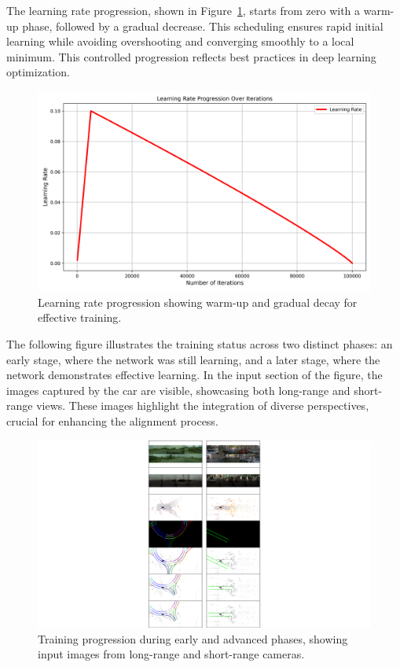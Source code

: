 The learning rate progression, shown in Figure~\ref{fig:learning_rate}, starts from zero with a warm-up phase, followed by a gradual decrease. This scheduling ensures rapid initial learning while avoiding overshooting and converging smoothly to a local minimum. This controlled progression reflects best practices in deep learning optimization.
\begin{figure}[H]
    \centering
    \includegraphics[width=0.75\linewidth]{LateX//figs/BEVlearning_rate_progression.png}
    \caption{Learning rate progression showing warm-up and gradual decay for effective training.}
    \label{fig:learning_rate}
\end{figure}

The following figure illustrates the training status across two distinct phases: an early stage, where the network was still learning, and a later stage, where the network demonstrates effective learning. In the input section of the figure, the images captured by the car are visible, showcasing both long-range and short-range views. These images highlight the integration of diverse perspectives, crucial for enhancing the alignment process.
\begin{figure}[H]
    \centering
    \includegraphics[width=1\linewidth]{LateX//figs/bev_traininig_phases.pdf}
    \caption{Training progression during early and advanced phases, showing input images from long-range and short-range cameras.}
    \label{fig:bev_training_phases}
\end{figure}

